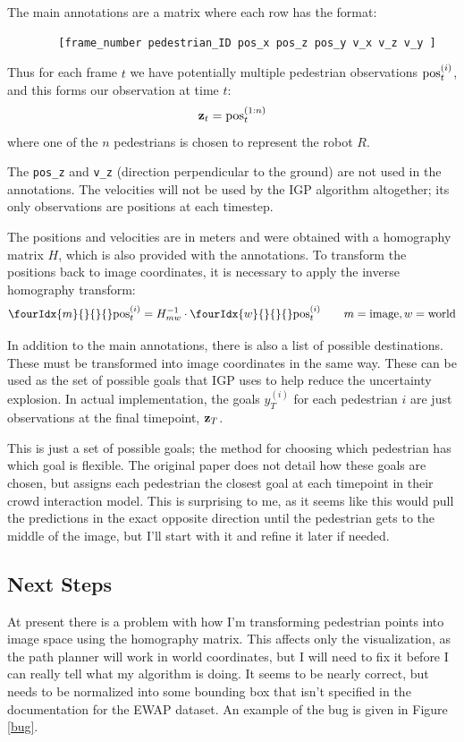 \documentclass[a4paper,11pt,headings=small]{article}
\begin{document}
The main annotations are a matrix where each row has the format:
\begin{verbatim}
        [frame_number pedestrian_ID pos_x pos_z pos_y v_x v_z v_y ]
\end{verbatim}

Thus for each frame $t$ we have potentially multiple pedestrian observations $\mathrm{pos}^{(i)}_t$, and this forms our observation at time $t$:
$$ \mathbf{z}_t = \mathrm{pos}^{(1:n)}_t $$
where one of the $n$ pedestrians is chosen to represent the robot $R$.

The \texttt{pos\_z} and \texttt{v\_z} (direction perpendicular to the ground) are not used in the annotations. The velocities will not be used by the IGP algorithm altogether; its only observations are positions at each timestep.

The positions and velocities are in meters and were obtained with a homography matrix $H$, which is also provided with the annotations. To transform the positions back to image coordinates, it is necessary to apply the inverse homography transform:
$$ \fourIdx{m}{}{}{}\post = H_{mw}^{-1} \cdot \fourIdx{w}{}{}{}\post \qquad m = \mathrm{image}, w = \mathrm{world} $$

In addition to the main annotations, there is also a list of possible destinations. These must be transformed into image coordinates in the same way. These can be used as the set of possible goals that IGP uses to help reduce the uncertainty explosion. In actual implementation, the goals $y^{(i)}_T$ for each pedestrian $i$ are just observations at the final timepoint, $\mathbf{z}_T$.

This is just a set of possible goals; the method for choosing which pedestrian has which goal is flexible. The original paper does not detail how these goals are chosen, but \cite{Pellegrini2009} assigns each pedestrian the closest goal at each timepoint in their crowd interaction model. This is surprising to me, as it seems like this would pull the predictions in the exact opposite direction until the pedestrian gets to the middle of the image, but I'll start with it and refine it later if needed.

\subsection*{Next Steps}
\quad At present there is a problem with how I'm transforming pedestrian points into image space using the homography matrix. This affects only the visualization, as the path planner will work in world coordinates, but I will need to fix it before I can really tell what my algorithm is doing. It seems to be nearly correct, but needs to be normalized into some bounding box that isn't specified in the documentation for the EWAP dataset. An example of the bug is given in Figure \ref{bug}.
\end{document}
